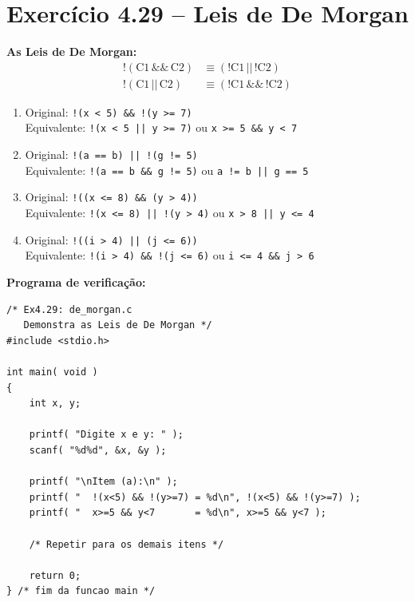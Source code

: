 \documentclass[12pt,a4paper]{article}
\begin{document}
\newpage

\section{Exercício 4.29 -- Leis de De Morgan}

\begin{respostabox}
\textbf{As Leis de De Morgan:}
\begin{align*}
  !(\text{C1} \,\&\&\, \text{C2}) &\equiv (!\text{C1} \,||\, !\text{C2}) \\
  !(\text{C1} \,||\, \text{C2}) &\equiv (!\text{C1} \,\&\&\, !\text{C2})
\end{align*}

\begin{enumerate}[label=\textbf{\alph*)}]

\item Original: \texttt{!(x < 5) \&\& !(y >= 7)}\\
Equivalente: \texttt{!(x < 5 || y >= 7)} \quad ou \quad \texttt{x >= 5 \&\& y < 7}

\item Original: \texttt{!(a == b) || !(g != 5)}\\
Equivalente: \texttt{!(a == b \&\& g != 5)} \quad ou \quad \texttt{a != b || g == 5}

\item Original: \texttt{!((x <= 8) \&\& (y > 4))}\\
Equivalente: \texttt{!(x <= 8) || !(y > 4)} \quad ou \quad \texttt{x > 8 || y <= 4}

\item Original: \texttt{!((i > 4) || (j <= 6))}\\
Equivalente: \texttt{!(i > 4) \&\& !(j <= 6)} \quad ou \quad \texttt{i <= 4 \&\& j > 6}

\end{enumerate}

\textbf{Programa de verificação:}
\begin{lstlisting}
/* Ex4.29: de_morgan.c
   Demonstra as Leis de De Morgan */
#include <stdio.h>

int main( void )
{
    int x, y;

    printf( "Digite x e y: " );
    scanf( "%d%d", &x, &y );

    printf( "\nItem (a):\n" );
    printf( "  !(x<5) && !(y>=7) = %d\n", !(x<5) && !(y>=7) );
    printf( "  x>=5 && y<7       = %d\n", x>=5 && y<7 );

    /* Repetir para os demais itens */

    return 0;
} /* fim da funcao main */
\end{lstlisting}
\end{respostabox}
\end{document}
